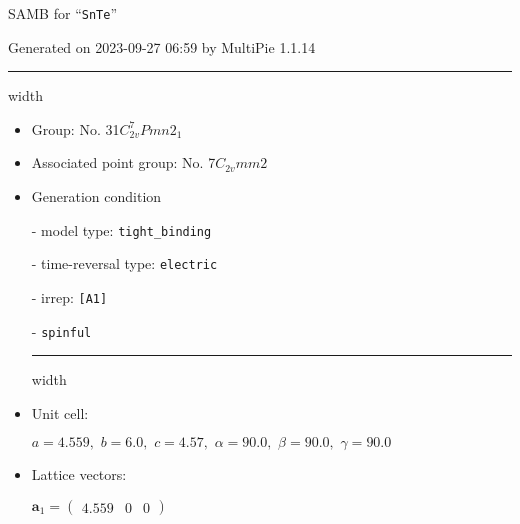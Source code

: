\documentclass[fleqn,10pt,landscape]{article}
\begin{document}
\setcounter{MaxMatrixCols}{16}

\setlength{\baselineskip}{16pt}
\footnotesize
\begin{center}
\LARGE
SAMB for ``\texttt{SnTe}''
\end{center}
\begin{flushright}
Generated on 2023-09-27 06:59 by MultiPie 1.1.14
\end{flushright}
\vspace{1cm}


 \hfil \hrule height 1mm width \textwidth \hfil

\begin{itemize}
\item Group: No. 31\quad$C_{2v}^{7}$\quad$Pmn2_1$\quad[ orthorhombic ]

\item Associated point group: No. 7\quad$C_{2v}$\quad$mm2$\quad[ orthorhombic ]

\vspace{5mm}

\item Generation condition

\quad - model type: \texttt{tight_binding}

\quad - time-reversal type: \texttt{electric}

\quad - irrep: \texttt{[A1]}

\quad - \texttt{spinful}


 \hfil \hrule height 1mm width \textwidth \hfil

\item Unit cell:

\quad $a=4.559,\,\, b=6.0,\,\, c=4.57,\,\, \alpha=90.0,\,\, \beta=90.0,\,\, \gamma=90.0$

\item Lattice vectors:

\quad $\bm{a}_1=\begin{pmatrix} 4.559 & 0 & 0 \end{pmatrix}$


\end{itemize}
\end{document}
